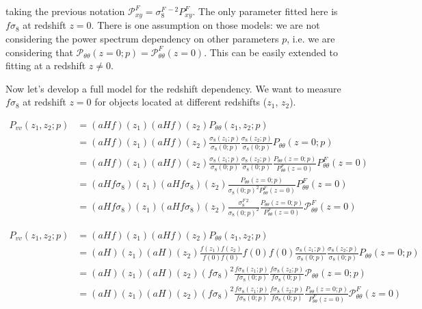 \documentclass{article}
\begin{document}
\noindent taking the previous notation $\mathcal{P}^F_{xy} = \sigma_8^{F\,-2} P^F_{xy}$. The only parameter fitted here is $f\sigma_8$ at redshift $z=0$. There is one assumption on those models: we are not considering the power spectrum dependency on other parameters $p$, i.e. we are considering that 
$\mathcal{P}_{\theta\theta}(z=0;p) = \mathcal{P}^F_{\theta\theta}(z=0)$. This can be easily extended to fitting at a redshift $z \neq 0$.


Now let's develop a full model for the redshift dependency. We want to measure $f\sigma_8$ at redshift $z=0$ for objects located at different redshifts ($z_1$, $z_2$). 

\begin{align}
    P_{vv}(z_1,z_2;p)
    &= (aHf)(z_1)(aHf)(z_2) P_{\theta\theta}(z_1, z_2;p) \\    
 & = (aHf)(z_1)(aHf)(z_2)  \frac{\sigma_8(z_1; p)}{\sigma_{8}(0; p)} \frac{\sigma_8(z_2; p)}{\sigma_{8}(0; p)} P_{\theta\theta}(z=0;p) \\
 & = (aHf)(z_1)(aHf)(z_2)  \frac{\sigma_8(z_1; p)}{\sigma_{8}(0; p)} \frac{\sigma_8(z_2; p)}{\sigma_{8}(0; p)} \frac{P_{\theta\theta}(z=0;p)}{P^{F}_{\theta\theta}(z=0)} P^{F}_{\theta\theta}(z=0) \\
 & = (aHf\sigma_8)(z_1)(aHf\sigma_8)(z_2) \frac{P_{\theta\theta}(z=0;p)}{\sigma_{8}(0; p)^2 P^{F}_{\theta\theta}(z=0)} P^{F}_{\theta\theta}(z=0) \\
 & = (aHf\sigma_8)(z_1)(aHf\sigma_8)(z_2) \frac{\sigma_{8}^{F\,2} }{\sigma_{8}(0; p)^2 } \frac{P_{\theta\theta}(z=0;p)}{P^{F}_{\theta\theta}(z=0)} \mathcal{P}^{F}_{\theta\theta}(z=0) 
\end{align}




\begin{align}
    P_{vv}(z_1,z_2;p)
    &= (aHf)(z_1)(aHf)(z_2) P_{\theta\theta}(z_1, z_2;p) \\    
 & = (aH)(z_1) (aH)(z_2) \frac{f(z_1)f(z_2)}{f(0)f(0)}  f(0)f(0) \frac{\sigma_8(z_1; p)}{\sigma_{8}(0; p)} \frac{\sigma_8(z_2; p)}{\sigma_{8}(0; p)} P_{\theta\theta}(z=0;p) \\
 & = (aH)(z_1) (aH)(z_2)  (f\sigma_8)^2 \frac{f\sigma_8(z_1; p)}{f\sigma_{8}(0; p)} \frac{f\sigma_8(z_2; p)}{f\sigma_{8}(0; p)} \mathcal{P}_{\theta\theta}(z=0;p) \\ 
 & = (aH)(z_1) (aH)(z_2)  (f\sigma_8)^2 \frac{f\sigma_8(z_1; p)}{f\sigma_{8}(0; p)} \frac{f\sigma_8(z_2; p)}{f\sigma_{8}(0; p)} \frac{P_{\theta\theta}(z=0;p)}{P^{F}_{\theta\theta}(z=0)} \mathcal{P}^{F}_{\theta\theta}(z=0) \\ 
\end{align}
\end{document}
